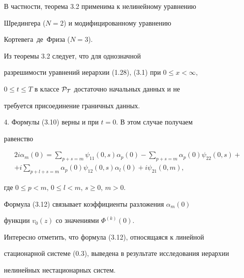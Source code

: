  


В частности, теорема 3.2 применима к нелинейному уравнению  


Шредингера ($N=2$) и модифицированному уравнению 


Кортевега~де~Фриза ($N=3$). 


 


\begin{notes} Из теоремы 3.2 следует, что для однозначной 


разрешимости уравнений иерархии (1.28), (3.1) при $0\le x<\infty$, 


$0\le t\le T$ в классе $\cal P_T$ достаточно начальных данных и не 


требуется присоединение граничных данных. 


\end{notes} 


 


4. Формулы (3.10) верны и при $t=0$. В этом случае получаем 


равенство 


\begin{multline} 


2i\alpha_m(0)=\sum_{p+s=m}\psi_{11}(0,s)\alpha_p(0)- 


\sum_{p+s=m}\alpha_p(0)\psi_{22}(0,s)+\\ 


+i\sum_{p+l+s=m}\alpha_p(0)\psi_{12}(0,s)\alpha_l(0)+ 


i\psi_{21}(0,m), 


\end{multline} 


где $0\le p<m$, $0\le l<m$, $s\ge 0$, $m>0$. 


Формула (3.12) связывает коэффициенты разложения $\alpha_m(0)$  


функции $v_0(z)$ со значениями $\Phi^{(k)}(0)$. 


 


Интересно отметить, что формула (3.12), относящаяся к линейной 


стационарной системе (0.3), выведена в результате исследования иерархии 


нелинейных нестационарных систем. 


 


 


